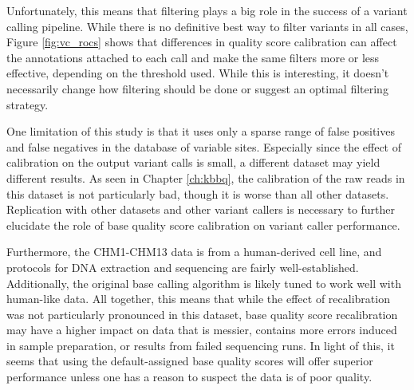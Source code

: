 Unfortunately, this means that filtering plays a big role in the success of a variant calling pipeline. While there is no definitive best way to filter variants in all cases, Figure \ref{fig:vc_rocs} shows that differences in quality score calibration can affect the annotations attached to each call and make the same filters more or less effective, depending on the threshold used. While this is interesting, it doesn't necessarily change how filtering should be done or suggest an optimal filtering strategy.

One limitation of this study is that it uses only a sparse range of false positives and false negatives in the database of variable sites. Especially since the effect of calibration on the output variant calls is small, a different dataset may yield different results. As seen in Chapter \ref{ch:kbbq}, the calibration of the raw reads in this dataset is not particularly bad, though it is worse than all other datasets. Replication with other datasets and other variant callers is necessary to further elucidate the role of base quality score calibration on variant caller performance.

Furthermore, the CHM1-CHM13 data is from a human-derived cell line, and protocols for DNA extraction and sequencing are fairly well-established. Additionally, the original base calling algorithm is likely tuned to work well with human-like data. All together, this means that while the effect of recalibration was not particularly pronounced in this dataset, base quality score recalibration may have a higher impact on data that is messier, contains more errors induced in sample preparation, or results from failed sequencing runs. In light of this, it seems that using the default-assigned base quality scores will offer superior performance unless one has a reason to suspect the data is of poor quality.


